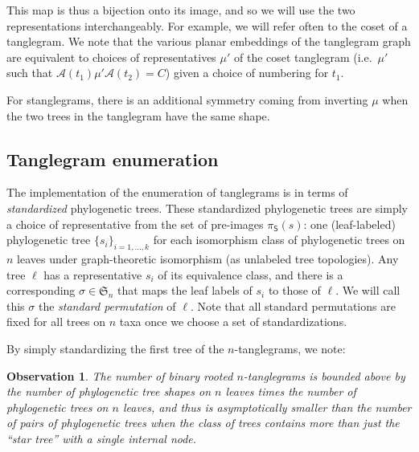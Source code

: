 \documentclass{amsart}
\newtheorem{observation}{Observation}
\newcommand{\fS}{\mathfrak S}
\newcommand{\aut}{\mathcal A}
\newcommand{\pairing}{\mu}
\newcommand{\shape}{\mathsf{S}}
\begin{document}
This map is thus a bijection onto its image, and so we will use the two representations interchangeably.
For example, we will refer often to the coset of a tanglegram.
We note that the various planar embeddings of the tanglegram graph are equivalent to choices of representatives $\pairing'$ of the coset tanglegram (i.e.\ $\pairing'$ such that $\aut(t_1) \pairing' \aut(t_2) = C$) given a choice of numbering for $t_1$.

For stanglegrams, there is an additional symmetry coming from inverting $\pairing$ when the two trees in the tanglegram have the same shape.


\subsection{Tanglegram enumeration}
The implementation of the enumeration of tanglegrams is in terms of \emph{standardized} phylogenetic trees.
These standardized phylogenetic trees are simply a choice of representative from the set of pre-images $\pi_\shape(s)$: one (leaf-labeled) phylogenetic tree $\{s_i\}_{i=1,\ldots,k}$ for each isomorphism class of phylogenetic trees on $n$ leaves under graph-theoretic isomorphism (as unlabeled tree topologies).
Any tree $\ell$ has a representative $s_i$ of its equivalence class, and there is a corresponding $\sigma \in \fS_n$ that maps the leaf labels of $s_i$ to those of $\ell$.
We will call this $\sigma$ the \emph{standard permutation} of $\ell$.
Note that all standard permutations are fixed for all trees on $n$ taxa once we choose a set of standardizations.

By simply standardizing the first tree of the $n$-tanglegrams, we note:
\begin{observation}
\label{obs:count}
The number of binary rooted $n$-tanglegrams is bounded above by the number of phylogenetic tree shapes on $n$ leaves times the number of phylogenetic trees on $n$ leaves, and thus is asymptotically smaller than the number of pairs of phylogenetic trees when the class of trees contains more than just the ``star tree'' with a single internal node.
\end{observation}
\end{document}
